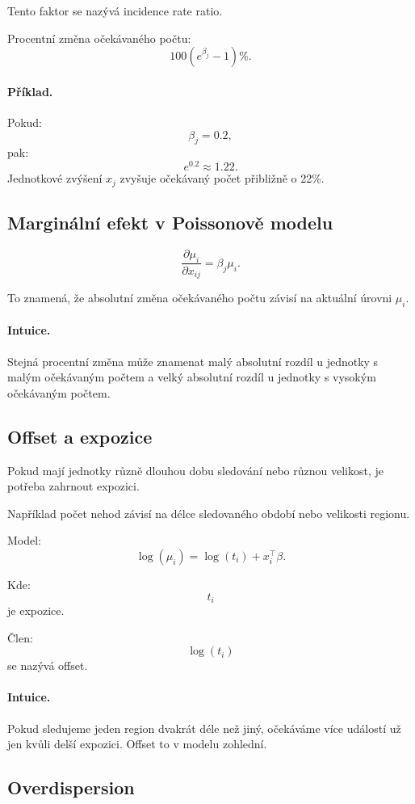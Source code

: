 Tento faktor se nazývá incidence rate ratio.

Procentní změna očekávaného počtu:
\[
100(e^{\beta_j}-1)\%.
\]

\paragraph{Příklad.}
Pokud:
\[
\beta_j=0.2,
\]
pak:
\[
e^{0.2}\approx 1.22.
\]
Jednotkové zvýšení $x_j$ zvyšuje očekávaný počet přibližně o 22\%.

\subsection{Marginální efekt v Poissonově modelu}

\[
\frac{\partial \mu_i}{\partial x_{ij}}
=
\beta_j\mu_i.
\]

To znamená, že absolutní změna očekávaného počtu závisí na aktuální úrovni $\mu_i$.

\paragraph{Intuice.}
Stejná procentní změna může znamenat malý absolutní rozdíl u jednotky s malým očekávaným počtem a velký
absolutní rozdíl u jednotky s vysokým očekávaným počtem.

\subsection{Offset a expozice}

Pokud mají jednotky různě dlouhou dobu sledování nebo různou velikost, je potřeba zahrnout expozici.

Například počet nehod závisí na délce sledovaného období nebo velikosti regionu.

Model:
\[
\log(\mu_i)=\log(t_i)+x_i^\top\beta.
\]

Kde:
\[
t_i
\]
je expozice.

Člen:
\[
\log(t_i)
\]
se nazývá offset.

\paragraph{Intuice.}
Pokud sledujeme jeden region dvakrát déle než jiný, očekáváme více událostí už jen kvůli delší expozici.
Offset to v modelu zohlední.

\subsection{Overdispersion}


